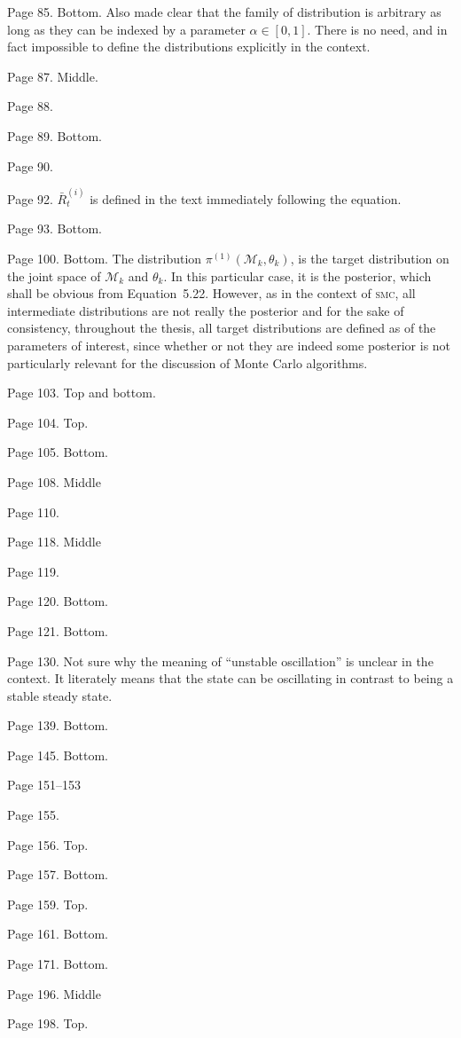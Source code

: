 \documentclass[11pt, fontset=Scala]{marticle}
\begin{document}
Page 85. Bottom. Also made clear that the family of distribution is arbitrary as long as they can be indexed by a parameter $\alpha \in [0, 1]$. There is no need, and in fact impossible to define the distributions explicitly in the context.

Page 87. Middle.

Page 88.

Page 89. Bottom.

Page 90.

Page 92. $\bar{R}_t^{(i)}$ is defined in the text immediately following the equation.

Page 93. Bottom.

Page 100. Bottom. The distribution $\pi^{(1)}(\mathcal{M}_k,\theta_k)$, is the target distribution on the joint space of $\mathcal{M}_k$ and $\theta_k$. In this particular case, it is the posterior, which shall be obvious from Equation~5.22. However, as in the context of \textsc{smc}, all intermediate distributions are not really the posterior and for the sake of consistency, throughout the thesis, all target distributions are defined as of the parameters of interest, since whether or not they are indeed some posterior is not particularly relevant for the discussion of Monte Carlo algorithms.

Page 103. Top and bottom.

Page 104. Top.

Page 105. Bottom.

Page 108. Middle

Page 110.

Page 118. Middle

Page 119.

Page 120. Bottom.

Page 121. Bottom.

Page 130. Not sure why the meaning of ``unstable oscillation'' is unclear in the context. It literately means that the state can be oscillating in contrast to being a stable steady state.

Page 139. Bottom.

Page 145. Bottom.

Page 151--153

Page 155.

Page 156. Top.

Page 157. Bottom.

Page 159. Top.

Page 161. Bottom.

Page 171. Bottom.

Page 196. Middle

Page 198. Top.

\end{document}
